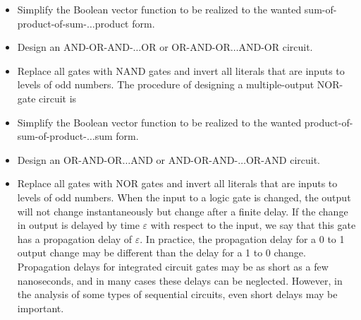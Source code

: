 \documentclass[a4paper,12pt]{article}
\begin{document}
\begin{itemize}
\begin{itemize}
\begin{itemize}
\begin{itemize}
\begin{itemize}
\begin{itemize}
\begin{itemize}
\ben
\item Simplify the Boolean vector function to be realized to the wanted sum-of-product-of-sum-$\ldots$product form.
\item Design an AND-OR-AND-$\ldots$OR or OR-AND-OR$\ldots$AND-OR circuit.
\item Replace all gates with NAND gates and invert all literals that are inputs to levels of odd numbers.
\een
The procedure of designing a multiple-output NOR-gate circuit is
\ben
\item Simplify the Boolean vector function to be realized to the wanted product-of-sum-of-product-$\ldots$sum form.
\item Design an OR-AND-OR$\ldots$AND or AND-OR-AND-$\ldots$OR-AND circuit.
\item Replace all gates with NOR gates and invert all literals that are inputs to levels of odd numbers.
\een
{}
When the input to a logic gate is changed, the output will not change instantaneously but change after a finite delay. If the change in output is delayed by time $\varepsilon$ with respect to the input, we say that this gate has a propagation delay of $\varepsilon$. In practice, the propagation delay for a 0 to 1 output change may be different than the delay for a 1 to 0 change. Propagation delays for integrated circuit gates may be as short as a few nanoseconds, and in many cases these delays can be neglected. However, in the analysis of some types of sequential circuits, even short delays may be important.


\end{itemize}
\end{itemize}
\end{itemize}
\end{itemize}
\end{itemize}
\end{itemize}
\end{itemize}
\end{document}
